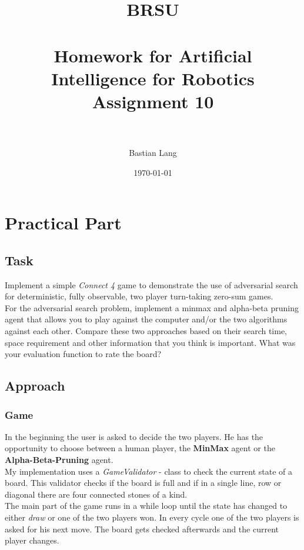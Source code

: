 \documentclass[paper=a4, fontsize=11pt]{scrartcl} %
\title{	
\normalfont \normalsize 
\textsc{BRSU} \\ [25pt] %
\horrule{0.5pt} \\[0.4cm] %
\huge Homework for Artificial Intelligence for Robotics\\Assignment 10 \\ %
\horrule{2pt} \\[0.5cm] %
}
\author{Bastian Lang} %
\date{\normalsize\today} %
\numberwithin{equation}{section} %
\numberwithin{figure}{section} %
\numberwithin{table}{section} %
\begin{document}
\maketitle %


\section{Practical Part}

\subsection{Task}
Implement a simple \textit{Connect 4} game to demonstrate the use of adversarial search for
deterministic, fully observable, two player turn-taking zero-sum games.\\
For the adversarial search problem, implement a minmax and alpha-beta pruning agent
that allows you to play against the computer and/or the two algorithms against each other.
Compare these two approaches based on their search time, space requirement and other
information that you think is important. What was your evaluation function to rate the
board?

\subsection{Approach}
\subsubsection{Game}
In the beginning the user is asked to decide the two players. He has the opportunity to choose between a human player, the \textbf{MinMax} agent or the \textbf{Alpha-Beta-Pruning} agent.\\
My implementation uses a \textit{GameValidator} - class to check the current state of a board. This validator checks if the board is full and if in a single line, row or diagonal there are four connected stones of a kind.\\
The main part of the game runs in a while loop until the state has changed to either \textit{draw} or one of the two players won. In every cycle one of the two players is asked for his next move. The board gets checked afterwards and the current player changes.\\
\end{document}
